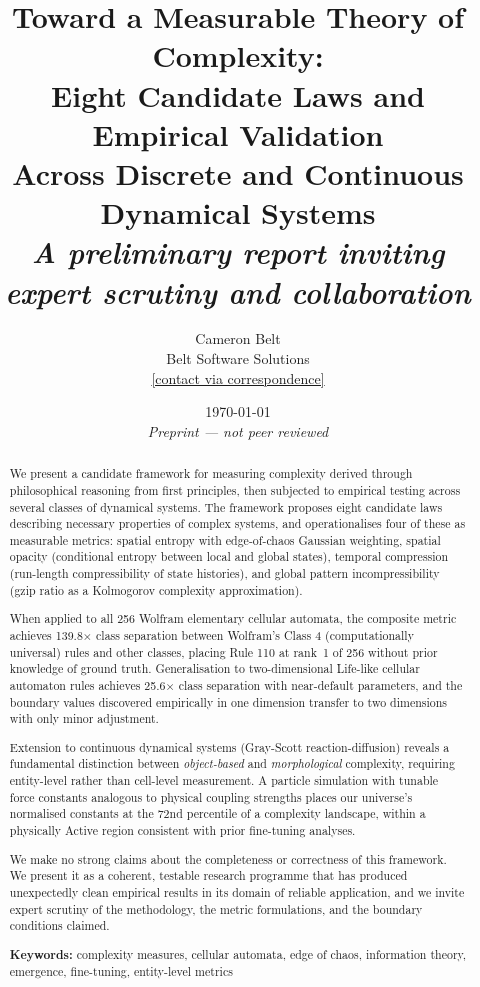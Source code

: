 \documentclass[12pt,a4paper]{article}
\title{\textbf{Toward a Measurable Theory of Complexity:\\
Eight Candidate Laws and Empirical Validation\\
Across Discrete and Continuous Dynamical Systems}\\[0.8em]
\large\textit{A preliminary report inviting expert scrutiny and collaboration}}
\author{Cameron Belt\\
\small Belt Software Solutions\\
\small \href{mailto:}{[contact via correspondence]}}
\date{\today\\[0.3em]
\small\textit{Preprint — not peer reviewed}}
\begin{document}
\maketitle

\begin{abstract}
\noindent
We present a candidate framework for measuring complexity derived through
philosophical reasoning from first principles, then subjected to empirical
testing across several classes of dynamical systems.
The framework proposes eight candidate laws describing necessary properties
of complex systems, and operationalises four of these as measurable metrics:
spatial entropy with edge-of-chaos Gaussian weighting, spatial opacity
(conditional entropy between local and global states), temporal compression
(run-length compressibility of state histories), and global pattern
incompressibility (gzip ratio as a Kolmogorov complexity approximation).

When applied to all 256 Wolfram elementary cellular automata, the composite
metric achieves 139.8$\times$ class separation between Wolfram's Class 4
(computationally universal) rules and other classes, placing Rule 110 at
rank~1 of 256 without prior knowledge of ground truth.
Generalisation to two-dimensional Life-like cellular automaton rules
achieves 25.6$\times$ class separation with near-default parameters,
and the boundary values discovered empirically in one dimension transfer
to two dimensions with only minor adjustment.

Extension to continuous dynamical systems (Gray-Scott reaction-diffusion)
reveals a fundamental distinction between \emph{object-based} and
\emph{morphological} complexity, requiring entity-level rather than
cell-level measurement.
A particle simulation with tunable force constants analogous to physical
coupling strengths places our universe's normalised constants at the 72nd
percentile of a complexity landscape, within a physically Active region
consistent with prior fine-tuning analyses.

We make no strong claims about the completeness or correctness of this
framework. We present it as a coherent, testable research programme that
has produced unexpectedly clean empirical results in its domain of
reliable application, and we invite expert scrutiny of the methodology,
the metric formulations, and the boundary conditions claimed.

\bigskip
\noindent\textbf{Keywords:} complexity measures, cellular automata,
edge of chaos, information theory, emergence, fine-tuning, entity-level metrics
\end{abstract}
\end{document}
